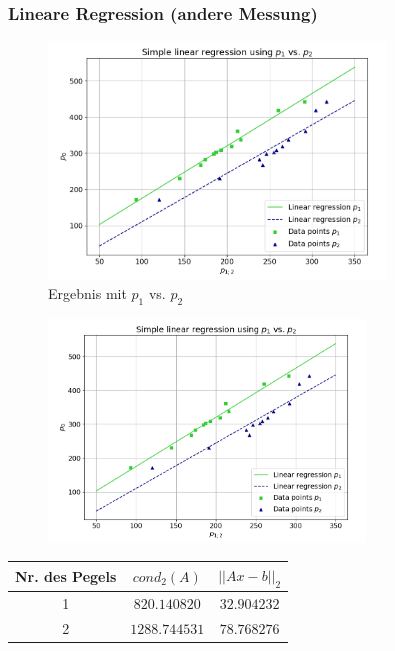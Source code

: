 \documentclass{beamer}
\begin{document}
\begin{frame} %
  \frametitle{Lineare Regression (andere Messung)} %
  \begin{figure}
    \centering
      \includegraphics[width=0.8\textwidth]{Linear_Regression_p2}
      \vspace{-1em}
    \caption{Ergebnis mit $p_1$ vs. $p_2$}
  \end{figure}
\end{frame}
\begin{frame}
  \begin{figure}
    \centering
      \includegraphics[width=0.75\textwidth]{Linear_Regression_p2}
  \end{figure}
  \vspace{-1em}
  \centering
  \begin{tabular}{c|c|c}
    Nr. des Pegels & $cond_2(A)$   & $||Ax-b||_2$\\ \hline
                 1 &  $820.140820$ & $32.904232$\\ \hline
                 2 & $1288.744531$ & $78.768276$
  \end{tabular}
\end{frame}
\end{document}
